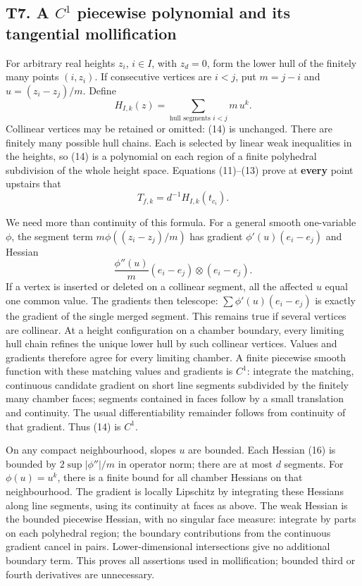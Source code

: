 \documentclass[
  10pt,
]{article}
\begin{document}
\subsection{\texorpdfstring{T7. A \(C^1\) piecewise polynomial and its
tangential
mollification}{T7. A C\^{}1 piecewise polynomial and its tangential mollification}}\label{t7.-a-c1-piecewise-polynomial-and-its-tangential-mollification}

For arbitrary real heights \(z_i\), \(i\in I\), with \(z_d=0\), form the
lower hull of the finitely many points \((i,z_i)\). If consecutive
vertices are \(i<j\), put \(m=j-i\) and \(u=(z_i-z_j)/m\). Define \[
               H_{I,k}(z)=\sum_{\text{hull segments }i<j}
                                 m\,u^k.                \tag{14}
\] Collinear vertices may be retained or omitted: (14) is unchanged.
There are finitely many possible hull chains. Each is selected by linear
weak inequalities in the heights, so (14) is a polynomial on each region
of a finite polyhedral subdivision of the whole height space. Equations
(11)--(13) prove at \textbf{every} point upstairs that \[
               T_{f,k}=d^{-1}H_{I,k}(t_{c_i}).            \tag{15}
\]

We need more than continuity of this formula. For a general smooth
one-variable \(\phi\), the segment term \(m\phi((z_i-z_j)/m)\) has
gradient \(\phi'(u)(e_i-e_j)\) and Hessian \[
            \frac{\phi''(u)}m(e_i-e_j)\otimes(e_i-e_j).  \tag{16}
\] If a vertex is inserted or deleted on a collinear segment, all the
affected \(u\) equal one common value. The gradients then telescope:
\(\sum\phi'(u)(e_i-e_j)\) is exactly the gradient of the single merged
segment. This remains true if several vertices are collinear. At a
height configuration on a chamber boundary, every limiting hull chain
refines the unique lower hull by such collinear vertices. Values and
gradients therefore agree for every limiting chamber. A finite piecewise
smooth function with these matching values and gradients is \(C^1\):
integrate the matching, continuous candidate gradient on short line
segments subdivided by the finitely many chamber faces; segments
contained in faces follow by a small translation and continuity. The
usual differentiability remainder follows from continuity of that
gradient. Thus (14) is \(C^1\).

On any compact neighbourhood, slopes \(u\) are bounded. Each Hessian
(16) is bounded by \(2\sup|\phi''|/m\) in operator norm; there are at
most \(d\) segments. For \(\phi(u)=u^k\), there is a finite bound for
all chamber Hessians on that neighbourhood. The gradient is locally
Lipschitz by integrating these Hessians along line segments, using its
continuity at faces as above. The weak Hessian is the bounded piecewise
Hessian, with no singular face measure: integrate by parts on each
polyhedral region; the boundary contributions from the continuous
gradient cancel in pairs. Lower-dimensional intersections give no
additional boundary term. This proves all assertions used in
mollification; bounded third or fourth derivatives are unnecessary.
\end{document}
